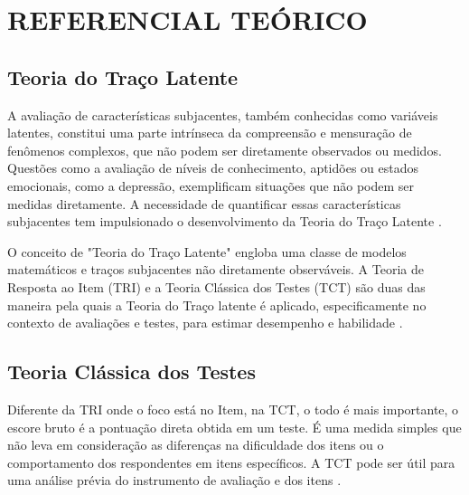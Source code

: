 \chapter{REFERENCIAL TEÓRICO}

\section{Teoria do Traço Latente}


 A avaliação de características subjacentes, também conhecidas como variáveis latentes, constitui uma parte intrínseca da compreensão e mensuração de fenômenos complexos, que não podem ser diretamente observados ou medidos. Questões como a avaliação de níveis de conhecimento, aptidões ou estados emocionais, como a depressão, exemplificam situações que não podem ser medidas diretamente. A necessidade de quantificar essas características subjacentes tem impulsionado o desenvolvimento da Teoria do Traço Latente \cite{pasquali2003fundamentos}.

O conceito de "Teoria do Traço Latente" engloba uma classe de modelos matemáticos e traços subjacentes não diretamente observáveis. A Teoria de Resposta ao Item (TRI) e a Teoria Clássica dos Testes (TCT) são duas das maneira pela quais a Teoria do Traço latente é aplicado, especificamente no contexto de avaliações e testes, para estimar desempenho e habilidade \cite{pasquali2018}.

\section{Teoria Clássica dos Testes}

Diferente da TRI onde o foco está no Item, na TCT, o todo é mais importante, o escore bruto é a pontuação direta obtida em um teste. É uma medida simples que não leva em consideração as diferenças na dificuldade dos itens ou o comportamento dos respondentes em itens específicos. A TCT pode ser útil para uma análise prévia do instrumento de avaliação e dos itens \cite{pasquali1996}.


\begin{comment}
	Na TCT a dificuldade do Item é calculado a partir da proporção de sujeitos que respondem corretamente tal item. O escore bruto é calculado somando-se o número de respostas corretas.
	
 Neste trabalho, são aplicados alguns procedimentos da Teoria Clássica dos Testes, incluindo a análise da Correlação Ponto-Bisserial e do Coeficiente Alfa de Cronbach.
\end{comment}

